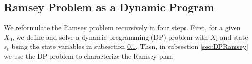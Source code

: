 \documentclass[12pt]{article}
\newcommand{\NW}[1]{{\textcolor{blue}{#1}}}
\begin{document}

%
%

\subsection{Ramsey Problem as a Dynamic Program} \label{sec:DPdefine}



We  reformulate  the Ramsey problem recursively in   four steps. First, for a given $X_0$, we define and solve  a dynamic programming (DP) problem with $X_t$ and state $s_t$ being the state variables in subsection \ref{sec:DPdefine}. Then, in subsection \ref{sec:DPRamsey} we use the DP problem  to  characterize the Ramsey plan. %
\end{document}

